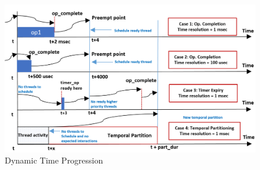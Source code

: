 \begin{figure}[h]
	\centering
	\includegraphics[width=\textwidth]{./figs/time}
	\caption{Dynamic Time Progression}
	\label{fig:time}
\end{figure}

